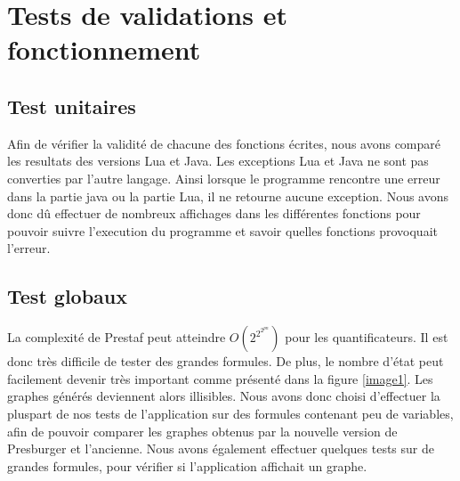 \section{Tests de validations et fonctionnement}

\subsection{Test unitaires}

Afin de vérifier la validité de chacune des fonctions écrites, nous avons comparé les resultats des versions Lua et Java. Les exceptions Lua et Java ne sont pas converties par l'autre langage. Ainsi lorsque le programme rencontre une erreur dans la partie java ou la partie Lua, il ne retourne aucune exception. Nous avons donc dû effectuer de nombreux affichages dans les différentes fonctions pour pouvoir suivre l'execution du programme et savoir quelles fonctions provoquait l'erreur. 

\subsection{Test globaux}

La complexité de Prestaf peut atteindre $O(2^{2^{2^{pn}}})$ pour les quantificateurs. Il est donc très difficile de tester des grandes formules. De plus, le nombre d'état peut facilement devenir très important comme présenté dans la figure \ref{image1}. Les graphes générés deviennent alors illisibles.
Nous avons donc choisi d'effectuer la pluspart de nos tests de l'application sur des formules contenant peu de variables, afin de pouvoir comparer les graphes obtenus par la nouvelle version de Presburger et l'ancienne. Nous avons également effectuer quelques tests sur de grandes formules, pour vérifier si l'application affichait un graphe.

